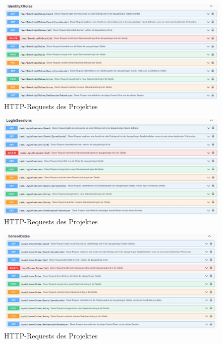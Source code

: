 \begin{figure}[H]
    \centering
    \includegraphics[width=1.6\textwidth]{pics/WebApiRequests5.JPG}
    \caption{HTTP-Requests des Projektes}
\end{figure}

\begin{figure}[H]
    \centering
    \includegraphics[width=1.6\textwidth]{pics/WebApiRequests6.JPG}
    \caption{HTTP-Requests des Projektes}
\end{figure}

\begin{figure}[H]
    \centering
    \includegraphics[width=1.6\textwidth]{pics/WebApiRequests7.JPG}
    \caption{HTTP-Requests des Projektes}
\end{figure}

